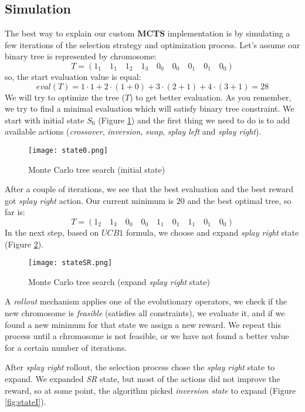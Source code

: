 \documentclass[12pt]{article}
\begin{document}
\subsection{Simulation}
The best way to explain our custom \textbf{MCTS} implementation is by simulating a few iterations of the selection strategy and optimization process. Let's assume our binary tree is represented by chromosome:
\[
    T = (1_1 \quad 1_1 \quad 1_2 \quad 1_3 \quad 0_0 \quad 0_0 \quad 0_1 \quad 0_1 \quad 0_0)
\]
so, the start evaluation value is equal:
\[
    eval(T) = 1\cdot1 + 2\cdot(1 + 0) + 3\cdot(2 + 1) + 4\cdot(3 + 1) = 28
\]
We will try to optimize the tree ($T$) to get better evaluation. As you remember, we try to find a minimal evaluation which will satisfy binary tree constraint.
We start with initial state $S_0$ (Figure \ref{fig:state0}) and the first thing we need to do is to add available actions (\textit{crossover}, \textit{inversion}, \textit{swap}, \textit{splay left} and \textit{splay right}).

\begin{figure}
\centering
\texttt{[image: state0.png]}
\caption{Monte Carlo tree search (initial state)}
\label{fig:state0}
\end{figure}

After a couple of iterations, we see that the best evaluation and the best reward got \textit{splay right} action.
Our current minimum is $20$ and the best optimal tree, so far is:
\[
    T = (1_2 \quad 1_3 \quad 0_0 \quad 0_0 \quad 1_1 \quad 0_1 \quad 1_1 \quad 0_1 \quad 0_0)
\]
In the next step, based on $UCB1$ formula, we choose and expand \textit{splay right} state (Figure \ref{fig:stateSR}).
\begin{figure}
\centering
\texttt{[image: stateSR.png]}
\caption{Monte Carlo tree search (expand \textit{splay right} state)}
\label{fig:stateSR}
\end{figure}

A \textit{rollout} mechanism applies one of the evolutionary operators, we check if the new chromosome is \textit{feasible} (satisfies all constraints), we evaluate it, and if we found a new minimum for that state we assign a new reward.
We repeat this process until a chromosome is not feasible, or we have not found a better value for a certain number of iterations.

After \textit{splay right} rollout, the selection process chose the \textit{splay right} state to expand. We expanded \textit{SR} state, but most of the actions did not improve the reward, so at some point, the algorithm picked \textit{inversion state} to expand (Figure \ref{fig:stateI}).
\end{document}
